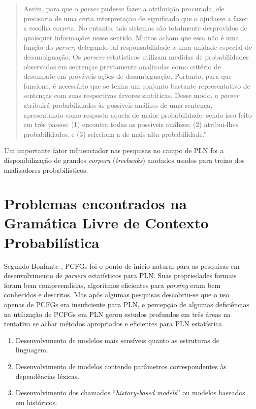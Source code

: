 \begin{quotation}
Assim, para que o \emph{parser} pudesse fazer a atribuição procurada, ele precisaria de uma certa interpretação de significado que o ajudasse a fazer a escolha correta. No entanto, tais sistemas são totalmente desprovidos de quaisquer informações nesse sentido. Muitos acham que essa não é uma função do \emph{parser}, delegando tal responsabilidade a uma unidade especial de desambiguação. Os \emph{parsers} estatísticos utilizam medidas de probabilidades observadas em sentenças previamente analisadas como critério de desempate em prováveis ações de desambiguação. Portanto, para que funcione, é necessário que se tenha um conjunto bastante representativo de sentenças com suas respectivas árvores sintáticas. Desse modo, o \emph{parser} atribuirá probabilidades às possíveis análises de uma sentença, apresentando como resposta aquela de maior probabilidade, sendo isso feito em três passos: (1) encontra todas as possíveis análises; (2) atribui-lhes probabilidades, e (3) seleciona a de mais alta probabilidade.''
\end{quotation}

Um importante fator influenciador nas pesquisas no campo de PLN foi a disponibilização de grandes \emph{corpora} (\emph{treebanks}) anotados usados para treino dos analisadores probabilísticos.

\section{Problemas encontrados na Gramática Livre de Contexto Probabilística}
\label{sec:prob_encontrados}

Segundo Bonfante \cite{bonfante03}, PCFGs foi o ponto de início natural para as pesquisas em desenvolvimento de \emph{parsers} estatísticos para PLN. Suas propriedades formais foram bem compreendidas, algoritmos eficientes para \emph{parsing} eram bem conhecidos e descritos. Mas após algumas pesquisas descobriu-se que o uso apenas de PCFGs era insuficiente para PLN, e percepção de algumas deficiências na utilização de PCFGs em PLN gerou estudos profundos em três áreas na tentativa se achar métodos apropriados e eficientes para PLN estatística.

\begin{enumerate}
  \item Desenvolvimento de modelos mais sensíveis quanto as estruturas de linguagem.
  \item Desenvolvimento de modelos contendo parâmetros correspondentes às dependências léxicas.
  \item Desenvolvimento dos chamados ``\emph{history-based models}'' ou modelos baseados em históricos.
\end{enumerate}

